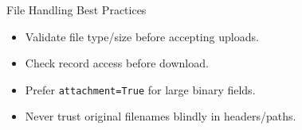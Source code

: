 \begin{frame}{File Handling Best Practices}
	\begin{itemize}
		\item Validate file type/size before accepting uploads.
		\item Check record access before download.
		\item Prefer \texttt{attachment=True} for large binary fields.
		\item Never trust original filenames blindly in headers/paths.
	\end{itemize}
\end{frame}

